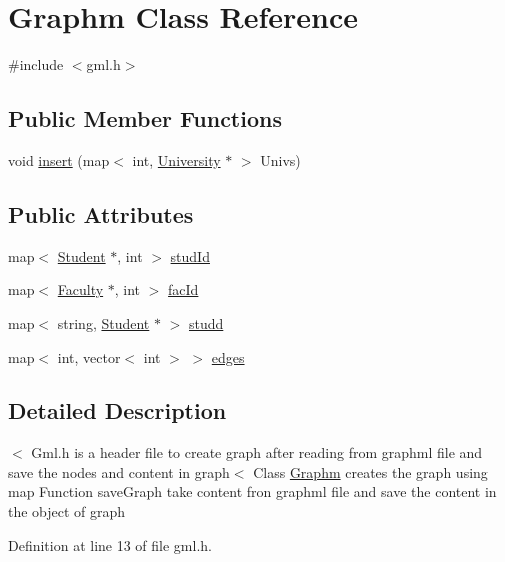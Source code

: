 \hypertarget{classGraphm}{\section{\-Graphm \-Class \-Reference}
\label{classGraphm}
}


{\ttfamily \#include $<$gml.\-h$>$}

\subsection*{\-Public \-Member \-Functions}
\begin{DoxyCompactItemize}
\item 
void \hyperlink{classGraphm_a4dbb05272ecb44d08f59daf879e56805}{insert} (map$<$ int, \hyperlink{classUniversity}{\-University} $\ast$ $>$ \-Univs)
\end{DoxyCompactItemize}
\subsection*{\-Public \-Attributes}
\begin{DoxyCompactItemize}
\item 
map$<$ \hyperlink{structStudent}{\-Student} $\ast$, int $>$ \hyperlink{classGraphm_a21845bc3fcd7390fecd156422d4c8d64}{stud\-Id}
\item 
map$<$ \hyperlink{structFaculty}{\-Faculty} $\ast$, int $>$ \hyperlink{classGraphm_adf5c6fb652850a1da2fa89d7ce23fafc}{fac\-Id}
\item 
map$<$ string, \hyperlink{structStudent}{\-Student} $\ast$ $>$ \hyperlink{classGraphm_a0d5476c6bb62a51485b59d436cb003d0}{studd}
\item 
map$<$ int, vector$<$ int $>$ $>$ \hyperlink{classGraphm_aed45ae01c467de1fda3ee2b8bb49e4b8}{edges}
\end{DoxyCompactItemize}


\subsection{\-Detailed \-Description}
$<$ \-Gml.\-h is a header file to create graph after reading from graphml file and save the nodes and content in graph$<$ \-Class \hyperlink{classGraphm}{\-Graphm} creates the graph using map \-Function save\-Graph take content fron graphml file and save the content in the object of graph 

\-Definition at line 13 of file gml.\-h.



